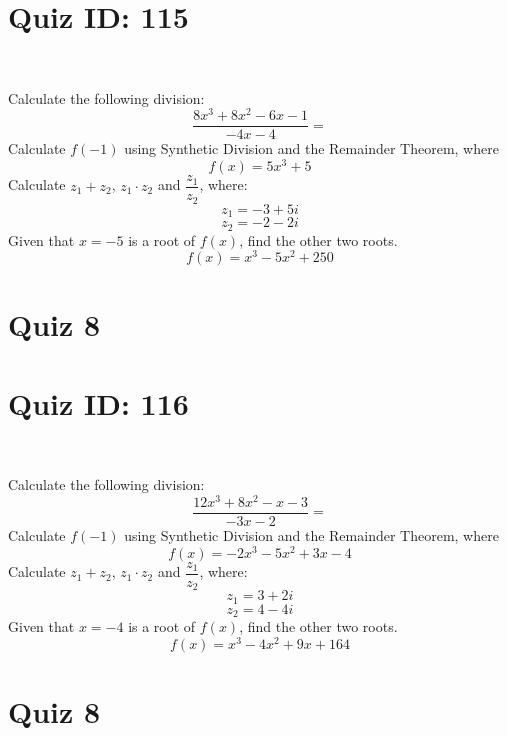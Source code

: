 \documentclass{exam}
\begin{document}
\section*{Quiz ID: 115}
\vspace{0.5cm}\
\vspace{1cm}\
\begin{questions}
\question Calculate the following division:\[\dfrac{
8x^3 + 8x^2 - 6x - 1}{
-4x - 4}=\] \makeemptybox{\stretch{2}}
\question Calculate $f(-1)$ using Synthetic Division and the Remainder Theorem, where\[f(x) = 
5x^3 + 5\]
\newpage\question Calculate $z_1+z_2$, $z_1\cdot z_2$ and $\dfrac{z_1}{z_2}$, where:\[z_1=-3+5\mathit{i}\]\[z_2=-2-2\mathit{i}\]\makeemptybox{\stretch{1}}
\question Given that $x=-5$ is a root of $f(x)$, find the other two roots.\[f(x)=
x^3 - 5x^2 + 250\]\makeemptybox{\stretch{1}}
\end{questions}\newpage
\newpage
\section*{Quiz 8}
\section*{Quiz ID: 116}
\vspace{0.5cm}\
\vspace{1cm}\
\begin{questions}
\question Calculate the following division:\[\dfrac{
12x^3 + 8x^2 - x - 3}{
-3x - 2}=\] 
\question Calculate $f(-1)$ using Synthetic Division and the Remainder Theorem, where\[f(x) = 
-2x^3 - 5x^2 + 3x - 4\]
\newpage\question Calculate $z_1+z_2$, $z_1\cdot z_2$ and $\dfrac{z_1}{z_2}$, where:\[z_1=3+2\mathit{i}\]\[z_2=4-4\mathit{i}\]\makeemptybox{\stretch{1}}
\question Given that $x=-4$ is a root of $f(x)$, find the other two roots.\[f(x)=
x^3 - 4x^2 + 9x + 164\]\makeemptybox{\stretch{1}}
\end{questions}\newpage
\newpage
\section*{Quiz 8}
\end{document}
